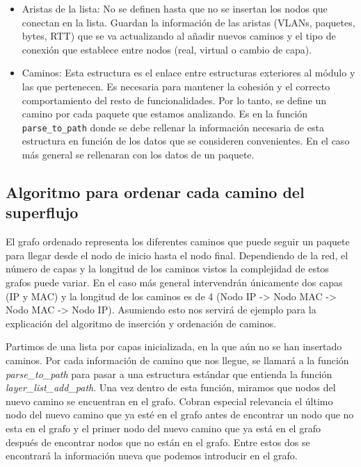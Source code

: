 \documentclass[tfg,epsbased,lof,lot,loa,covers,final,copyright,overleaf]{tfgtfmthesisuam}
\begin{document}
\begin{itemize}
    \item Aristas de la lista: No se definen hasta que no se insertan los nodos que conectan en la lista. Guardan la información de las aristas (VLANs, paquetes, bytes, RTT) que se va actualizando al añadir nuevos caminos y el tipo de conexión que establece entre nodos (real, virtual o cambio de capa).
    \item Caminos: Esta estructura es el enlace entre estructuras exteriores al módulo y las que pertenecen. Es necesaria para mantener la cohesión y el correcto comportamiento del resto de funcionalidades. Por lo tanto, se define un camino por cada paquete que estamos analizando. Es en la función \texttt{parse\_to\_path} donde se debe rellenar la información necesaria de esta estructura en función de los datos que se consideren convenientes. En el caso más general se rellenaran con los datos de un paquete.
\end{itemize}

\subsection{Algoritmo para ordenar cada camino del superflujo}
El grafo ordenado representa los diferentes caminos que puede seguir un paquete para llegar desde el nodo de inicio hasta el nodo final. Dependiendo de la red, el número de capas y la longitud de los caminos vistos la complejidad de estos grafos puede variar. En el caso más general intervendrán únicamente dos capas (IP y MAC) y la longitud de los caminos es de 4 (Nodo IP -> Nodo MAC -> Nodo MAC -> Nodo IP). Asumiendo esto nos servirá de ejemplo para la explicación del algoritmo de inserción y ordenación de caminos.

Partimos de una lista por capas inicializada, en la que aún no se han insertado caminos. Por cada información de camino que nos llegue, se llamará a la función \textit{parse\_to\_path} para pasar a una estructura estándar que entienda la función \textit{layer\_list\_add\_path}. Una vez dentro de esta función, miramos que nodos del nuevo camino se encuentran en el grafo. Cobran especial relevancia el último nodo del nuevo camino que ya esté en el grafo antes de encontrar un nodo que no esta en el grafo y el primer nodo del nuevo camino que ya está en el grafo después de encontrar nodos que no están en el grafo. Entre estos dos se encontrará la información nueva que podemos introducir en el grafo.
\end{document}
